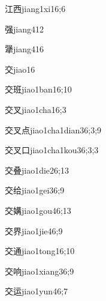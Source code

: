 \begin{verbete}{江西}{jiang1xi1}{6;6}
\end{verbete}
\begin{verbete}{强}{jiang4}{12}
\end{verbete}
\begin{verbete}{犟}{jiang4}{16}
\end{verbete}
\begin{verbete}{交}{jiao1}{6}
\end{verbete}
\begin{verbete}{交班}{jiao1ban1}{6;10}
\end{verbete}
\begin{verbete}{交叉}{jiao1cha1}{6;3}
\end{verbete}
\begin{verbete}{交叉点}{jiao1cha1dian3}{6;3;9}
\end{verbete}
\begin{verbete}{交叉口}{jiao1cha1kou3}{6;3;3}
\end{verbete}
\begin{verbete}{交叠}{jiao1die2}{6;13}
\end{verbete}
\begin{verbete}{交给}{jiao1gei3}{6;9}
\end{verbete}
\begin{verbete}{交媾}{jiao1gou4}{6;13}
\end{verbete}
\begin{verbete}{交界}{jiao1jie4}{6;9}
\end{verbete}
\begin{verbete}{交通}{jiao1tong1}{6;10}
\end{verbete}
\begin{verbete}{交响}{jiao1xiang3}{6;9}
\end{verbete}
\begin{verbete}{交运}{jiao1yun4}{6;7}
\end{verbete}
